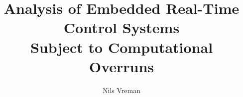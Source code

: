 \begin{titlepages}
    \author{Nils Vreman}
    \title{Analysis of Embedded Real-Time Control Systems \\Subject to Computational Overruns}
\end{titlepages}
